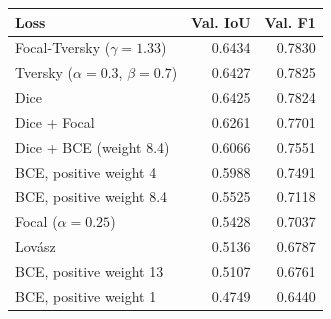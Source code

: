\begin{tabular}{@{}lrr@{}}
\toprule
Loss & Val. IoU & Val. F1 \\
\midrule
Focal-Tversky ($\gamma=1.33$) & 0.6434 & 0.7830 \\
Tversky ($\alpha=0.3$, $\beta=0.7$) & 0.6427 & 0.7825 \\
Dice & 0.6425 & 0.7824 \\
Dice + Focal & 0.6261 & 0.7701 \\
Dice + BCE (weight 8.4) & 0.6066 & 0.7551 \\
BCE, positive weight 4 & 0.5988 & 0.7491 \\
BCE, positive weight 8.4 & 0.5525 & 0.7118 \\
Focal ($\alpha=0.25$) & 0.5428 & 0.7037 \\
Lov\'asz & 0.5136 & 0.6787 \\
BCE, positive weight 13 & 0.5107 & 0.6761 \\
BCE, positive weight 1 & 0.4749 & 0.6440 \\
\bottomrule
\end{tabular}

